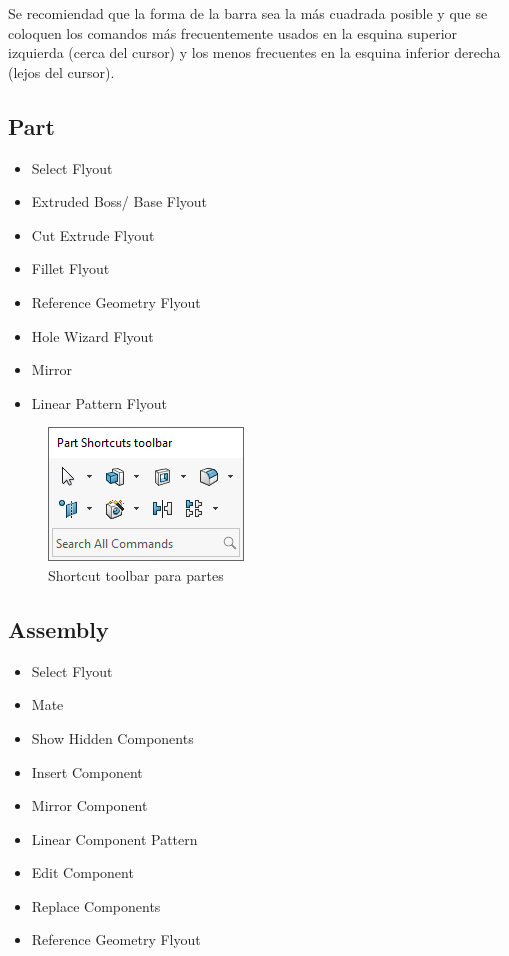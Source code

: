 \documentclass{report}
\begin{document}
Se recomiendad que la forma de la barra sea la más cuadrada posible y que se coloquen los comandos más frecuentemente usados en la esquina superior izquierda (cerca del cursor) y los menos frecuentes en la esquina inferior derecha (lejos del cursor).

\subsection{Part}

\begin{itemize}
	\item Select Flyout
	\item Extruded Boss/ Base Flyout
	\item Cut Extrude Flyout
	\item Fillet Flyout
	\item Reference Geometry Flyout
	\item Hole Wizard Flyout
	\item Mirror
	\item Linear Pattern Flyout
\end{itemize}

\begin{figure}[H]
	\centering
	\includegraphics[width=0.45\linewidth, height=0.5\textheight,keepaspectratio]{Imagenes/solidworks_shortcutbars_03}
	\caption{Shortcut toolbar para partes}
	\label{fig:solidworksshortcutbars03}
\end{figure}

\subsection{Assembly}

\begin{itemize}
	\item Select Flyout
	\item Mate
	\item Show Hidden Components
	\item Insert Component
	\item Mirror Component
	\item Linear Component Pattern
	\item Edit Component
	\item Replace Components
	\item Reference Geometry Flyout
\end{itemize}
\end{document}
